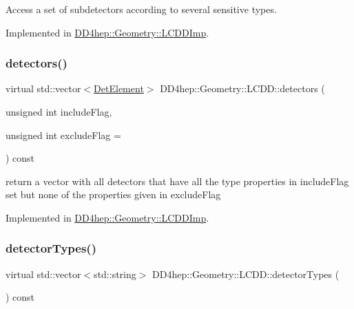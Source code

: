 Access a set of subdetectors according to several sensitive types. 



Implemented in \hyperlink{class_d_d4hep_1_1_geometry_1_1_l_c_d_d_imp_a506c2c9e6f14c2537f6285de281b6f58}{D\+D4hep\+::\+Geometry\+::\+L\+C\+D\+D\+Imp}.

\hypertarget{class_d_d4hep_1_1_geometry_1_1_l_c_d_d_a1cdc7a631ac397f64b40e7232ee04639}{}\label{class_d_d4hep_1_1_geometry_1_1_l_c_d_d_a1cdc7a631ac397f64b40e7232ee04639} 
\subsubsection{\texorpdfstring{detectors()}{detectors()}\hspace{0.1cm}{\footnotesize\ttfamily [4/4]}}
{\footnotesize\ttfamily virtual std\+::vector$<$\hyperlink{class_d_d4hep_1_1_geometry_1_1_det_element}{Det\+Element}$>$ D\+D4hep\+::\+Geometry\+::\+L\+C\+D\+D\+::detectors (\begin{DoxyParamCaption}\item[{unsigned int}]{include\+Flag,  }\item[{unsigned int}]{exclude\+Flag = {} }\end{DoxyParamCaption}) const\hspace{0.3cm}{\ttfamily [pure virtual]}}

return a vector with all detectors that have all the type properties in include\+Flag set but none of the properties given in exclude\+Flag 

Implemented in \hyperlink{class_d_d4hep_1_1_geometry_1_1_l_c_d_d_imp_a2336b9403823002fb322001b4b723e9e}{D\+D4hep\+::\+Geometry\+::\+L\+C\+D\+D\+Imp}.

\hypertarget{class_d_d4hep_1_1_geometry_1_1_l_c_d_d_a196cc776b69db52d89f3396bf03d224f}{}\label{class_d_d4hep_1_1_geometry_1_1_l_c_d_d_a196cc776b69db52d89f3396bf03d224f} 
\subsubsection{\texorpdfstring{detector\+Types()}{detectorTypes()}}
{\footnotesize\ttfamily virtual std\+::vector$<$std\+::string$>$ D\+D4hep\+::\+Geometry\+::\+L\+C\+D\+D\+::detector\+Types (\begin{DoxyParamCaption}{ }\end{DoxyParamCaption}) const\hspace{0.3cm}{\ttfamily [pure virtual]}}



